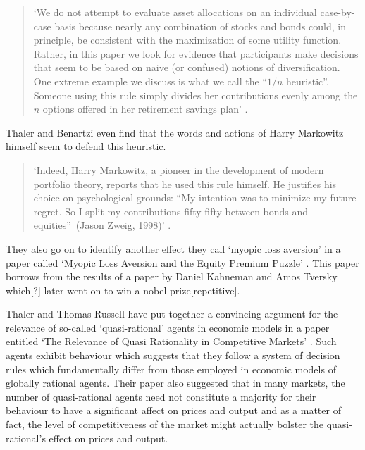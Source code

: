 \documentclass{ucthesis}
\begin{document}
\begin{quote}
`We do not attempt to evaluate asset allocations on an individual
case-by-case basis because nearly any combination of stocks and bonds could,
in principle, be consistent with the maximization of some utility function.
Rather, in this paper we look for evidence that participants make decisions
that seem to be based on naive (or confused) notions of diversification. One
extreme example we discuss is what we call the \textquotedblleft $1/n$
heuristic\textquotedblright . Someone using this rule simply divides her
contributions evenly among the $n$ options offered in her retirement savings
plan' \cite[pp. 79]{naive}.
\end{quote}

Thaler and Benartzi even find that the words and actions of Harry Markowitz
himself seem to defend this heuristic.

\begin{quote}
`Indeed, Harry Markowitz, a pioneer in the development of modern portfolio
theory, reports that he used this rule himself. He justifies his choice on
psychological grounds: \textquotedblleft My intention was to minimize my
future regret. So I split my contributions fifty-fifty between bonds and
equities\textquotedblright\ (Jason Zweig, 1998)' \cite[pp. 80]{naive}.
\end{quote}

They also go on to identify another effect they call `myopic loss aversion'
in a paper called `Myopic Loss Aversion and the Equity Premium Puzzle' \cite[%
1995]{myopic}. This paper borrows from the results of a paper by Daniel
Kahneman and Amos Tversky which{\LARGE [?]} later went on to win a nobel
prize{\LARGE [repetitive]}.

Thaler and Thomas Russell have put together a convincing argument for the
relevance of so-called `quasi-rational' agents in economic models in a paper
entitled `The Relevance of Quasi Rationality in Competitive Markets' \cite[%
1985]{quasi}. Such agents exhibit behaviour which suggests that they follow
a system of decision rules which fundamentally differ from those employed in
economic models of globally rational agents. Their paper also suggested that
in many markets, the number of quasi-rational agents need not constitute a
majority for their behaviour to have a significant affect on prices and
output and as a matter of fact, the level of competitiveness of the market
might actually bolster the quasi-rational's effect on prices and output.
\end{document}
